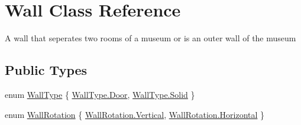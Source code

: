 \hypertarget{class_wall}{}\section{Wall Class Reference}
\label{class_wall}


A wall that seperates two rooms of a museum or is an outer wall of the museum  


\subsection*{Public Types}
\begin{DoxyCompactItemize}
\item 
enum \mbox{\hyperlink{class_wall_a1366d94ac70428624a6703d7db89638d}{Wall\+Type}} \{ \mbox{\hyperlink{class_wall_a1366d94ac70428624a6703d7db89638daf44e14d49cd011d1e873d9fe0c4624f1}{Wall\+Type.\+Door}}, 
\mbox{\hyperlink{class_wall_a1366d94ac70428624a6703d7db89638dae41480b6bbfbf7407974a88d3d34f4fa}{Wall\+Type.\+Solid}}
 \}
\item 
enum \mbox{\hyperlink{class_wall_a0ff16a0e73bfc8f0d89c5fd6849e3a97}{Wall\+Rotation}} \{ \mbox{\hyperlink{class_wall_a0ff16a0e73bfc8f0d89c5fd6849e3a97a06ce2a25e5d12c166a36f654dbea6012}{Wall\+Rotation.\+Vertical}}, 
\mbox{\hyperlink{class_wall_a0ff16a0e73bfc8f0d89c5fd6849e3a97ac1b5fa03ecdb95d4a45dd1c40b02527f}{Wall\+Rotation.\+Horizontal}}
 \}
\end{DoxyCompactItemize}
